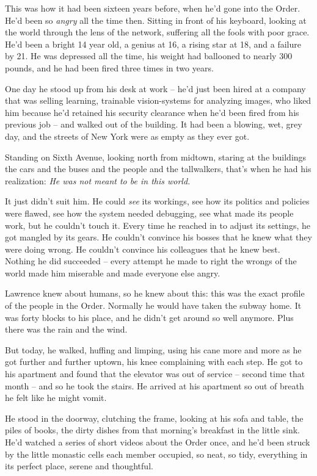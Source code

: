 This was how it had been sixteen years before, when he'd gone into the 
Order. He'd been so \emph{angry} all the time then. Sitting in front of 
his keyboard, looking at the world through the lens of the network, 
suffering all the fools with poor grace. He'd been a bright 14 year 
old, a genius at 16, a rising star at 18, and a failure by 21. He was 
depressed all the time, his weight had ballooned to nearly 300 pounds, 
and he had been fired three times in two years.

One day he stood up from his desk at work -- he'd just been hired at a 
company that was selling learning, trainable vision-systems for 
analyzing images, who liked him because he'd retained his security 
clearance when he'd been fired from his previous job -- and walked out 
of the building. It had been a blowing, wet, grey day, and the streets 
of New York were as empty as they ever got.

Standing on Sixth Avenue, looking north from midtown, staring at the 
buildings the cars and the buses and the people and the tallwalkers, 
that's when he had his realization: \emph{He was not meant to be in 
this world.}

It just didn't suit him. He could \emph{see} its workings, see how its 
politics and policies were flawed, see how the system needed debugging, 
see what made its people work, but he couldn't touch it. Every time he 
reached in to adjust its settings, he got mangled by its gears. He 
couldn't convince his bosses that he knew what they were doing wrong. 
He couldn't convince his colleagues that he knew best. Nothing he did 
succeeded -- every attempt he made to right the wrongs of the world 
made him miserable and made everyone else angry.

Lawrence knew about humans, so he knew about this: this was the exact 
profile of the people in the Order. Normally he would have taken the 
subway home. It was forty blocks to his place, and he didn't get around 
so well anymore. Plus there was the rain and the wind.

But today, he walked, huffing and limping, using his cane more and more 
as he got further and further uptown, his knee complaining with each 
step. He got to his apartment and found that the elevator was out of 
service -- second time that month -- and so he took the stairs. He 
arrived at his apartment so out of breath he felt like he might vomit.

He stood in the doorway, clutching the frame, looking at his sofa and 
table, the piles of books, the dirty dishes from that morning's 
breakfast in the little sink. He'd watched a series of short videos 
about the Order once, and he'd been struck by the little monastic cells 
each member occupied, so neat, so tidy, everything in its perfect 
place, serene and thoughtful.

